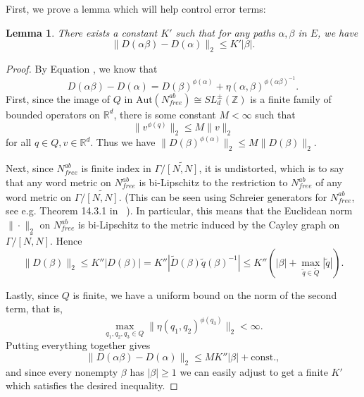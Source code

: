 \documentclass[12pt,reqno]{article}
\makeatletter
\let\reftagform@=\tagform@
\def\tagform@#1{\maketag@@@{(\ignorespaces\textcolor{purple}{#1}\unskip\@@italiccorr)}}
\renewcommand{\eqref}[1]{\textup{\reftagform@{\ref{#1}}}}
\numberwithin{equation}{section}
\newcommand{\R}{\mathbb{R}}
\newcommand{\Z}{\mathbb{Z}}
\newcommand{\Aut}{\mathrm{Aut}}
\newtheorem{lemma}{Lemma}
\makeatother
\begin{document}
First, we prove a lemma which will help control error terms:
\begin{lemma} \label{displacementedgelength}
There exists a constant $K'$ such that for any paths $\alpha, \beta$ in $E$, we have
\[
   \| D(\alpha \beta) - D(\alpha) \|_2 \le K' |\beta|.
\]
\end{lemma}
\begin{proof}
By Equation \eqref{eq:noncommdisplacement}, we know that 
\[
   D(\alpha \beta) - D(\alpha) = D(\beta)^{\phi(\alpha)} + \eta(\alpha, \beta)^{\phi(\alpha \beta)^{-1}}.
\]
First, since the image of $Q$ in $\Aut(N^{ab}_{free}) \cong SL_d^{\pm}(\Z)$ is a finite family of bounded operators on $\R^d$, there is
some constant $M < \infty$ such that
\[
   \| v^{\phi(q)} \|_2 \le M \|v\|_2   
\]
for all $q \in Q, v \in \R^d$. Thus we have $\| D(\beta)^{\phi(\alpha)} \|_2 \le M \| D(\beta) \|_2$.

Next, since $N^{ab}_{free}$ is finite index in $\Gamma/\widetilde{[N,N]}$, it is undistorted,  
which is to say that any word metric on
$N^{ab}_{free}$ is bi-Lipschitz to the restriction to $N^{ab}_{free}$ of any word metric on $\Gamma/\widetilde{[N,N]}$.
(This can be seen using Schreier generators for $N^{ab}_{free}$, see e.g. Theorem 14.3.1 in ~\cite{KarMer}). In particular,
this means that the Euclidean norm $\| \cdot \|_2$ on $N^{ab}_{free}$ is bi-Lipschitz to the metric induced by the Cayley graph
on $\Gamma/\widetilde{[N,N]}$. Hence 
\[
   \| D(\beta) \|_2 \le K'' | D(\beta) | = K'' |\tilde{D}(\beta) \tilde{q}(\beta)^{-1}| \le K''( |\beta| + \max_{\tilde{q} \in \tilde{Q}} |\tilde{q}| ).
\]


Lastly, since $Q$ is finite, we have a uniform bound on the norm of the second term, that is,
\[
   \max_{q_1,q_2,q_3 \in Q} \| \eta(q_1,q_2)^{\phi(q_3)} \|_2 < \infty.
\]
Putting everything together gives
\[
   \| D(\alpha \beta) - D(\alpha) \|_2 \le MK'' |\beta| + \mathrm{const.},
\]
and since every nonempty $\beta$ has $|\beta| \ge 1$ we can easily adjust to get a finite $K'$ which satisfies the desired inequality.
\end{proof}
\end{document}
